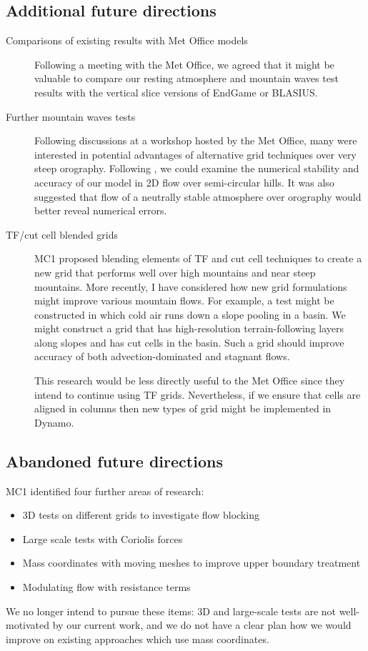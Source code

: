 \documentclass[a4paper]{article}
\begin{document}
\subsection*{Additional future directions}
\begin{description}
	\item[Comparisons of existing results with Met Office models]{Following a meeting with the Met Office, we agreed that it might be valuable to compare our resting atmosphere and mountain waves test results with the vertical slice versions of EndGame or BLASIUS.}
	\item[Further mountain waves tests]{Following discussions at a workshop hosted by the Met Office, many were interested in potential advantages of alternative grid techniques over very steep orography.  Following \citet{yamazaki-satomura2010}, we could examine the numerical stability and accuracy of our model in 2D flow over semi-circular hills.  It was also suggested that flow of a neutrally stable atmosphere over orography would better reveal numerical errors.}
	\item[TF/cut cell blended grids]{
MC1 proposed blending elements of TF and cut cell techniques to create a new grid that performs well over high mountains and near steep mountains.
More recently, I have considered how new grid formulations might improve various mountain flows.  For example, a test might be constructed in which cold air runs down a slope pooling in a basin.  We might construct a grid that has high-resolution terrain-following layers along slopes and has cut cells in the basin.  Such a grid should improve accuracy of both advection-dominated and stagnant flows.

This research would be less directly useful to the Met Office since they intend to continue using TF grids.  Nevertheless, if we ensure that cells are aligned in columns then new types of grid might be implemented in Dynamo.}
\end{description}

\subsection*{Abandoned future directions}
MC1 identified four further areas of research:
\begin{itemize}
	\item 3D tests on different grids to investigate flow blocking
	\item Large scale tests with Coriolis forces
	\item Mass coordinates with moving meshes to improve upper boundary treatment
	\item Modulating flow with resistance terms
\end{itemize}
We no longer intend to pursue these items: 3D and large-scale tests are not well-motivated by our current work, and we do not have a clear plan how we would improve on existing approaches which use mass coordinates. 
\end{document}
